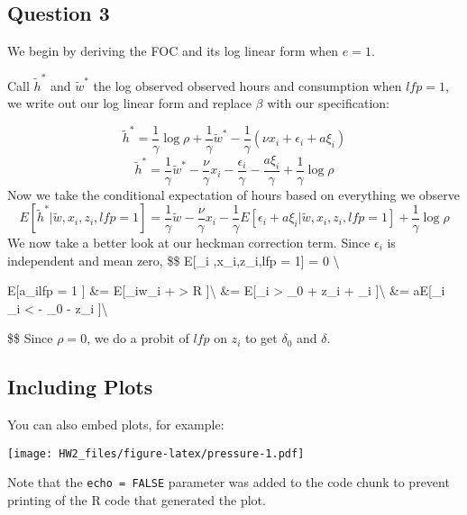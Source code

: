 \documentclass[]{article}
\begin{document}
\hypertarget{question-3}{%
\subsection{Question 3}\label{question-3}}

We begin by deriving the FOC and its log linear form when \(e = 1\).

Call \(\tilde{h}^*\) and \(\tilde{w}^*\) the log observed observed hours
and consumption when \(lfp = 1\), we write out our log linear form and
replace \(\beta\) with our specification:

\[
 \tilde{h}^* = \frac{1}{\gamma}\log \rho + \frac{1}{\gamma}  \tilde{w}^* - \frac{1}{\gamma} (\nu x_i + \epsilon_i + a\xi_i)
\] \[
 \tilde{h}^* = \frac{1}{\gamma}  \tilde{w}^* - \frac{\nu}{\gamma}x_i - \frac{\epsilon_i}{\gamma} - \frac{a\xi_i}{\gamma} + \frac{1}{\gamma} \log \rho
\] Now we take the conditional expectation of hours based on everything
we observe \[
E[ \tilde{h}^* |\tilde{w},x_i,z_i,lfp = 1 ] = \frac{1}{\gamma} \tilde{w} - \frac{\nu}{\gamma}x_i - \frac{1}{\gamma} E[\epsilon_i + a\xi_i |\tilde{w},x_i,z_i,lfp = 1 ] + \frac{1}{\gamma} \log \rho
\] We now take a better look at our heckman correction term. Since
\(\epsilon_i\) is independent and mean zero, \$\$ E{[}\epsilon\_i
\textbar{} ,x\_i,z\_i,lfp = 1{]} = 0 \textbackslash{}

E{[}a\xi\_i\textbar{}lfp = 1 {]} \&= E{[}\xi\_i\textbar{}\log w\_i +
\log \rho \textgreater{} \log R {]}\textbackslash{} \&=
E{[}\xi\_i\textbar{} \log \rho \textgreater{} \delta\_0 + \delta z\_i +
\xi\_i {]}\textbackslash{} \&= aE{[}\xi\_i\textbar{} \xi\_i \textless{}
\log \rho - \delta\_0 - \delta z\_i {]}\textbackslash{}

\$\$ Since \(\rho = 0\), we do a probit of \(lfp\) on \(z_i\) to get
\(\delta_0\) and \(\delta\).

\hypertarget{including-plots}{%
\subsection{Including Plots}\label{including-plots}}

You can also embed plots, for example:

\texttt{[image: HW2\_files/figure-latex/pressure-1.pdf]}

Note that the \texttt{echo\ =\ FALSE} parameter was added to the code
chunk to prevent printing of the R code that generated the plot.
\end{document}
